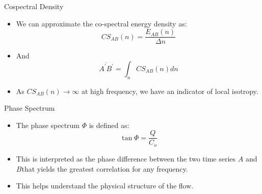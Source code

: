 \begin{frame}{Cospectral Density}
\begin{itemize}
	\item We can approximate the co-spectral energy density as:
	$$CS_{AB}(n) = \frac{E_{AB}(n)}{\Delta n}$$
	\item And 
	$$\overline{A^\prime B^\prime} = \displaystyle \int_n CS_{AB}(n) dn$$
	\item As $CS_{AB}(n) \rightarrow \infty$ at high frequency, we have an indicator of local isotropy.
\end{itemize}
\end{frame}
\begin{frame}{Phase Spectrum}
\begin{itemize}
	\item The phase spectrum $\Phi$ is defined as:
	$$\tan{\Phi}=\frac{Q}{C_o}$$
	\item This is interpreted as the phase difference between the two time series $A$ and $B$that yields the greatest correlation for any frequency.
	\item This helps understand the physical structure of the flow.
\end{itemize}
\end{frame}



